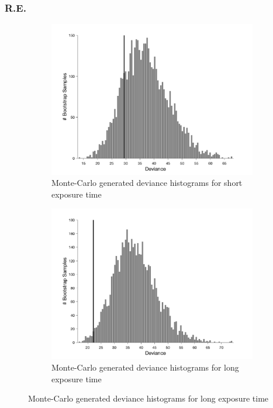 \documentclass{article}
\begin{document}
\subsubsection*{R.E.}
\begin{figure}[!hb]
    \begin{subfigure}{0.494\textwidth}
        \centering
        \includegraphics[width = \linewidth]{Thesis/plots/gof/segDist/segDist_re_short_bootstrap.png}
        \caption{Monte-Carlo generated deviance histograms for short exposure time}
        \label{fig:da_gof_short_bootstrap}
    \end{subfigure}
    \hspace{0.01\textwidth}
    \begin{subfigure}{0.494\textwidth}
        \centering
        \includegraphics[width = \linewidth]{Thesis/plots/gof/segDist/segDist_re_long_bootstrap.png}
        \caption{Monte-Carlo generated deviance histograms for long exposure time}
        \label{fig:da_gof_long_bootstrap}
    \end{subfigure}
    

\end{figure}
\end{document}
